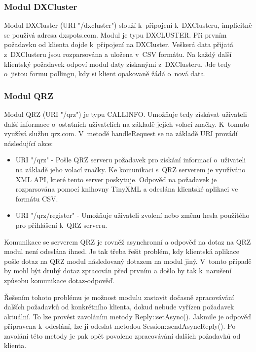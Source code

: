 \subsubsection{Modul DXCluster}

Modul DXCluster (URI "/dxcluster") slouží k~připojení k~DXClusteru, implicitně
se používá adresa dxspots.com. Modul je typu DXCLUSTER.
Při prvním požadavku od klienta dojde k~připojení na DXCluster.
Veškerá data přijatá z~DXClusteru jsou rozparsována a uložena v~CSV formátu. Na každý
další klientský požadavek odpoví modul daty získanými z~DXClusteru. Jde tedy o~jistou formu pollingu, kdy si klient
opakovaně žádá o~nová data.

\subsubsection{Modul QRZ}

Modul QRZ (URI "/qrz") je typu CALLINFO. Umožňuje tedy získávat uživateli další informace o~ostatních uživatelích na základě jejich
volací značky. K~tomuto využívá službu qrz.com. V~metodě handleRequest se na základě URI provádí následující akce:

\begin{itemize}
\item URI "/qrz" - Pošle QRZ serveru požadavek pro získání informací o~uživateli na základě jeho volací značky. Ke komunikaci 
s~QRZ serverem je využíváno XML API, které tento server poskytuje. Odpověď na požadavek je rozparsována pomocí knihovny 
TinyXML a odeslána klientské aplikaci ve formátu CSV.
\item URI "/qrz/register" - Umožňuje uživateli zvolení nebo změnu hesla použitého pro přihlášení k~QRZ serveru.
\end{itemize}

Komunikace se serverem QRZ je rovněž asynchronní a odpověď na dotaz na QRZ modul není odeslána ihned.
Je tak třeba řešit problém, kdy klientská aplikace pošle dotaz na QRZ modul
následovaný dotazem na modul jiný. V~tomto případě by mohl být druhý dotaz zpracován před prvním a došlo by tak k~narušení
způsobu komunikace dotaz-odpověď.

Řešením tohoto problému je možnost modulu zastavit dočasně zpracovávání dalších požadavků od konkrétního klienta, dokud 
nebude vyřízen požadavek aktuální. To lze provést zavoláním metody Reply::setAsync(). Jakmile je odpověď připravena
k~odeslání, lze ji odeslat metodou Session::sendAsyncReply(). Po zavolání této metody je pak opět povoleno zpracovávání
dalších požadavků od klienta.

